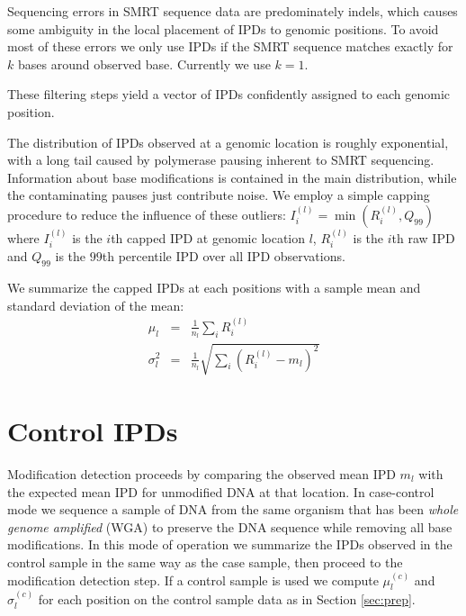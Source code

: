 \documentclass[pdftex]{article}
\begin{document}
Sequencing errors in SMRT sequence data are predominately indels, which causes some ambiguity in the local placement of IPDs to genomic positions.  To avoid most of these errors we only use IPDs if the SMRT sequence matches exactly for $k$ bases around observed base. Currently we use $k=1$.

These filtering steps yield a vector of IPDs confidently assigned to each genomic position.

The distribution of IPDs observed at a genomic location is roughly exponential, with a long tail caused by polymerase pausing inherent to SMRT sequencing. Information about base modifications is contained in the main distribution, while the contaminating pauses just contribute noise.  We employ a simple capping procedure to reduce the influence of these outliers: 
$I_i^{(l)} = \min(R_i^{(l)}, Q_{99})$ where $I_i^{(l)}$ is the $i$th capped IPD at genomic location $l$, $R_i^{(l)}$ is the $i$th raw IPD and $Q_{99}$ is the $99$th percentile IPD over all IPD observations.

We summarize the capped IPDs at each positions with a sample mean and standard deviation of the mean:
\begin{eqnarray} 
\mu_l & = & \frac{1}{n_l} \sum_i R_i^{(l)} \\
\sigma_l^2 & = & \frac{1}{n_l} \sqrt{\sum_i (R_i^{(l)} - m_l)^2 }
\end{eqnarray}


\section{Control IPDs}

Modification detection proceeds by comparing the observed mean IPD $m_l$ with the expected mean IPD for unmodified DNA at that location. In case-control mode we sequence a sample of DNA from the same organism that has been \emph{whole genome amplified} (WGA) to preserve the DNA sequence while removing all base modifications. In this mode of operation we summarize the IPDs observed in the control sample in the same way as the case sample, then proceed to the modification detection step. If a control sample is used we compute $\mu_l^{(c)}$ and $\sigma_l^{(c)}$ for each position on the control sample data as in Section \ref{sec:prep}.
\end{document}
